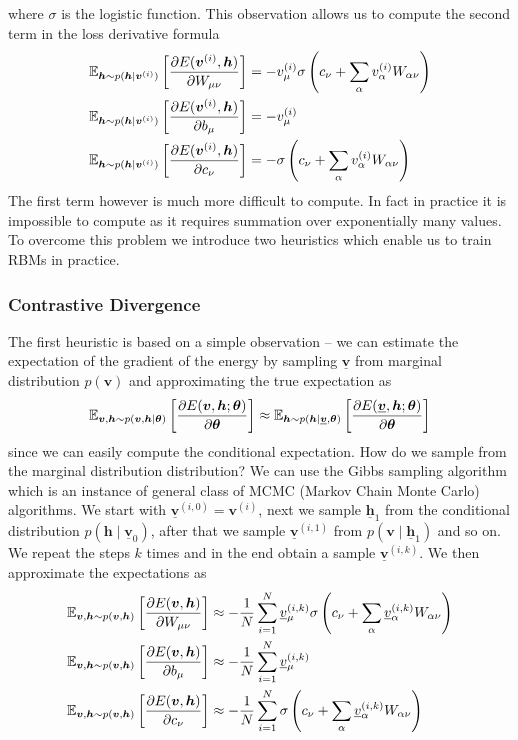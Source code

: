 \documentclass{myclass}
\begin{document}
where \(\sigma\) is the logistic function. This observation allows us to compute the second term in
the loss derivative formula
\[
\begin{split}
&\mathbb{E}_{\bm{h} \sim p(\bm{h} \mid \bm{v}^{(i)})}\left[ \pdv{E(\bm{v}^{(i)}, \bm{h})}{W_{\mu\nu}}\right] = -v_\mu^{(i)} \sigma\left(c_\nu + \sum_\alpha v_\alpha^{(i)} W_{\alpha\nu}\right)\\
&\mathbb{E}_{\bm{h} \sim p(\bm{h} \mid \bm{v}^{(i)})}\left[ \pdv{E(\bm{v}^{(i)}, \bm{h})}{b_{\mu}}\right] = -v_\mu^{(i)}\\
&\mathbb{E}_{\bm{h} \sim p(\bm{h} \mid \bm{v}^{(i)})}\left[ \pdv{E(\bm{v}^{(i)}, \bm{h})}{c_\nu}\right] = - \sigma\left(c_\nu + \sum_\alpha v_\alpha^{(i)} W_{\alpha\nu}\right)
\end{split}
\]
The first term however is much more difficult to compute. In fact in practice it is impossible to
compute as it requires summation over exponentially many values. To overcome this problem we
introduce two heuristics which enable us to train RBMs in practice.

\subsubsection{Contrastive Divergence}

The first heuristic is based on a simple observation -- we can estimate the expectation of the
gradient of the energy by sampling \(\underline{\bm{v}}\) from marginal distribution \(p(\bm{v})\)
and approximating the true expectation as
\[
   \mathbb{E}_{\bm{v}, \bm{h} \sim p(\bm{v},\bm{h} \mid \bm{\theta})}\left[\pdv{E(\bm{v},\bm{h}; \bm{\theta})}{\bm{\theta}}\right] \approx \mathbb{E}_{\bm{h} \sim p(\bm{h} \mid \underline{\bm{v}}, \bm{\theta})}\left[\pdv{E(\underline{\bm{v}},\bm{h}; \bm{\theta})}{\bm{\theta}}\right]
\]
since we can easily compute the conditional expectation. How do we sample from the marginal
distribution distribution? We can use the Gibbs sampling algorithm which is an instance of general
class of MCMC (Markov Chain Monte Carlo) algorithms. We start with \(\underline{\bm{v}}^{(i,0)} =
\bm{v}^{(i)}\), next we sample \(\underline{\bm{h}}_1\) from the conditional distribution \(p(\bm{h}
\mid \underline{\bm{v}}_0)\), after that we sample \(\underline{\bm{v}}^{(i,1)}\) from \(p(\bm{v}
\mid \underline{\bm{h}}_1)\) and so on. We repeat the steps \(k\) times and in the end obtain a
sample \(\underline{\bm{v}}^{(i,k)}\). We then approximate the expectations as
\[
\begin{split}
&\mathbb{E}_{\bm{v},\bm{h} \sim p(\bm{v},\bm{h})}\left[ \pdv{E(\bm{v}, \bm{h})}{W_{\mu\nu}}\right] \approx - \frac{1}{N}\sum_{i=1}^N \underline{v}_\mu^{(i,k)} \sigma\left(c_\nu + \sum_\alpha \underline{v}_\alpha^{(i,k)} W_{\alpha\nu}\right)\\
&\mathbb{E}_{\bm{v},\bm{h} \sim p(\bm{v},\bm{h})}\left[ \pdv{E(\bm{v}, \bm{h})}{b_{\mu}}\right] \approx - \frac{1}{N}\sum_{i=1}^N \underline{v}_\mu^{(i,k)}\\
&\mathbb{E}_{\bm{v},\bm{h} \sim p(\bm{v},\bm{h})}\left[ \pdv{E(\bm{v}, \bm{h})}{c_\nu}\right] \approx - \frac{1}{N}\sum_{i=1}^N \sigma\left(c_\nu + \sum_\alpha \underline{v}_\alpha^{(i,k)} W_{\alpha\nu}\right)
\end{split}
\]
\end{document}
